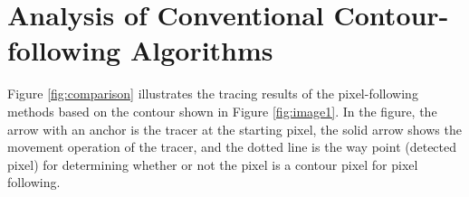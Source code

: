 
\section{Analysis of Conventional Contour-following Algorithms}


Figure \ref{fig:comparison} illustrates the tracing results of the pixel-following methods based on the contour shown in Figure \ref{fig:image1}. In the figure, the arrow with an anchor is the tracer at the starting pixel, the solid arrow shows the movement operation of the tracer, and the dotted line is the way point (detected pixel) for determining whether or not the pixel is a contour pixel for pixel following.

